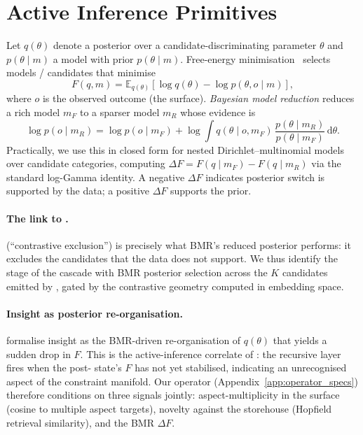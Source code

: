 \section{Active Inference Primitives}\label{sec:active_inference_background}

Let $q(\theta)$ denote a posterior over a candidate-discriminating parameter $\theta$ and $p(\theta\mid m)$ a model with prior $p(\theta\mid m)$. Free-energy minimisation~\citep{Friston2017ActiveInferenceCuriosity} selects models / candidates that minimise
\begin{equation}
F(q,m) = \mathbb{E}_{q(\theta)}\!\left[\log q(\theta) - \log p(\theta, o\mid m)\right],
\end{equation}
where $o$ is the observed outcome (the surface). \emph{Bayesian model reduction} \citep{FristonPenny2011,Friston2018BayesianModelReductionArxiv} reduces a rich model $m_F$ to a sparser model $m_R$ whose evidence is
\begin{equation}
\log p(o\mid m_R) = \log p(o\mid m_F) + \log \int q(\theta\mid o, m_F)\,\frac{p(\theta\mid m_R)}{p(\theta\mid m_F)} \,\mathrm{d}\theta.
\end{equation}
Practically, we use this in closed form for nested Dirichlet--multinomial models over candidate categories, computing $\Delta F = F(q\mid m_F) - F(q\mid m_R)$ via the standard log-Gamma identity. A negative $\Delta F$ indicates posterior switch is supported by the data; a positive $\Delta F$ supports the prior.

\paragraph{The link to .}  (``contrastive exclusion'') is precisely what BMR's reduced posterior performs: it excludes the candidates that the data does not support. We thus identify the  stage of the cascade with BMR posterior selection across the $K$ candidates emitted by , gated by the  contrastive geometry computed in embedding space.

\paragraph{Insight as posterior re-organisation.} \citet{Friston2017ActiveInferenceCuriosity} formalise insight as the BMR-driven re-organisation of $q(\theta)$ that yields a sudden drop in $F$. This is the active-inference correlate of : the recursive layer fires when the post- state's $F$ has not yet stabilised, indicating an unrecognised aspect of the constraint manifold. Our  operator (Appendix~\ref{app:operator_specs}) therefore conditions on three signals jointly: aspect-multiplicity in the surface (cosine to multiple aspect targets), novelty against the storehouse (Hopfield retrieval similarity), and the BMR $\Delta F$.

